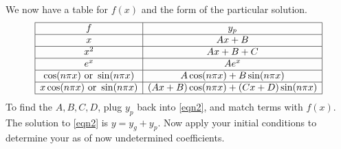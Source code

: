 \documentclass{article}
\begin{document}
We now have a table for $f(x)$ and the form of the particular solution.
\[
\begin{array}{|c|c|}
\hline
f & y_p\\\hline
x & Ax+B\\\hline
x^2 & Ax+B+C\\\hline
e^x & Ae^x\\\hline
\cos(n\pi x) \text{ or } \sin(n\pi x) & A\cos(n\pi x) + B\sin(n\pi x)\\\hline
x\cos(n\pi x) \text{ or } \sin(n\pi x) & (Ax+B)\cos(n\pi x) + (Cx +D)\sin(n\pi x)\\\hline
\end{array}
\]
To find the $A,B,C,D$, plug $y_p$ back into \autoref{eqn2}, and match terms with $f(x)$.
The solution to \autoref{eqn2} is $y=y_g+y_p$.
Now apply your initial conditions to determine your as of now undetermined coefficients.
\end{document}
